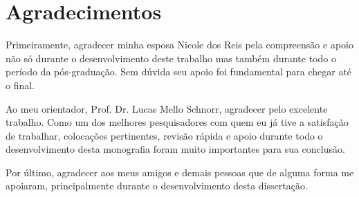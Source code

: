 \chapter*{Agradecimentos}

Primeiramente, agradecer minha esposa Nicole dos Reis pela compreensão e 
apoio não só durante o desenvolvimento deste trabalho mas também durante todo o 
período da pós-graduação. Sem dúvida seu apoio foi fundamental para chegar até 
o final.

Ao meu orientador, Prof. Dr. Lucas Mello Schnorr, agradecer pelo excelente 
trabalho. Como um dos melhores pesquisadores com quem eu já tive a satisfação 
de trabalhar, colocações pertinentes, revisão rápida e apoio durante 
todo o desenvolvimento desta monografia foram muito importantes para sua 
conclusão.

Por último, agradecer aos meus amigos e demais pessoas que de alguma forma me 
apoiaram, principalmente durante o desenvolvimento desta dissertação. 

